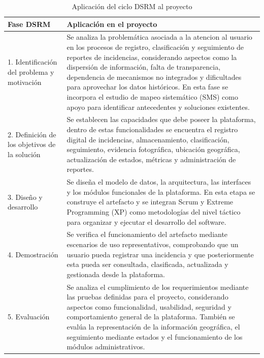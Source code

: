 \begin{table}[htbp]
	\centering
	\caption{Aplicación del ciclo DSRM al proyecto}
	\label{tab:aplicacion_dsrm}
	\begin{tabularx}{\textwidth}{X X}
		\toprule
		\textbf{Fase DSRM} &
		\textbf{Aplicación en el proyecto} \\
		\midrule
		
		1. Identificación del problema y motivación &
		Se analiza la problemática asociada a la atencion al usuario en los procesos de registro, clasificación y seguimiento de reportes de incidencias, considerando aspectos como la dispersión de información, falta de transparencia, dependencia de mecanismos no integrados y dificultades para aprovechar los datos históricos. En esta fase se incorpora el estudio de mapeo sistemático (SMS) como apoyo para identificar antecedentes y soluciones existentes. \\
		
		\addlinespace
		\midrule
		
		2. Definición de los objetivos de la solución &
		Se establecen las capacidades que debe poseer la plataforma, dentro de estas funcionalidades se encuentra el registro digital de incidencias, almacenamiento, clasificación, seguimiento, evidencia fotográfica, ubicación geográfica, actualización de estados, métricas y administración de reportes. \\
		
		\addlinespace
		\midrule
		
		3. Diseño y desarrollo &
		Se diseña el modelo de datos, la arquitectura, las interfaces y los módulos funcionales de la plataforma. En esta etapa se construye el artefacto y se integran Scrum y Extreme Programming (XP) como metodologías del nivel táctico para organizar y ejecutar el desarrollo del software. \\
		
		\addlinespace
		\midrule
		
		4. Demostración &
		Se verifica el funcionamiento del artefacto mediante escenarios de uso representativos, comprobando que un usuario pueda registrar una incidencia y que posteriormente esta pueda ser consultada, clasificada, actualizada y gestionada desde la plataforma. \\
		
		\addlinespace
		\midrule
		
		5. Evaluación &
		Se analiza el cumplimiento de los requerimientos mediante las pruebas definidas para el proyecto, considerando aspectos como funcionalidad, usabilidad, seguridad y comportamiento general de la plataforma. También se evalúa la representación de la información geográfica, el seguimiento mediante estados y el funcionamiento de los módulos administrativos. \\
		

\end{tabularx}
\end{table}
